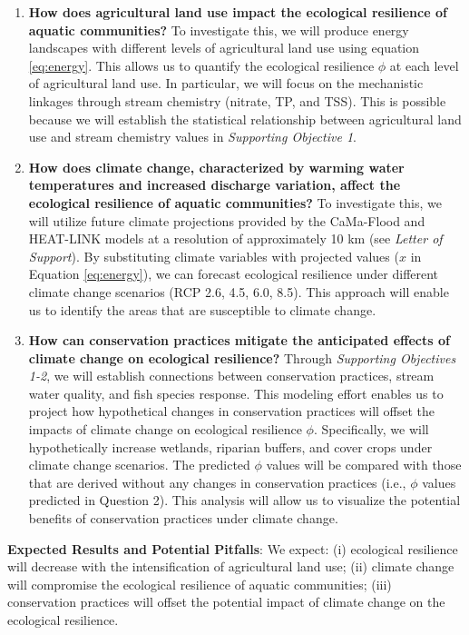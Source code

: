 \documentclass[12pt, class=article, crop=false]{standalone}
\begin{document}
\begin{enumerate}
    \item \textbf{How does agricultural land use impact the ecological resilience of aquatic communities?}
    To investigate this, we will produce energy landscapes with different levels of agricultural land use using equation \ref{eq:energy}.
    This allows us to quantify the ecological resilience $\phi$ at each level of agricultural land use. In particular, we will focus on the mechanistic linkages through stream chemistry (nitrate, TP, and TSS).
    This is possible because we will establish the statistical relationship between agricultural land use and stream chemistry values in \textit{Supporting Objective 1}.
    \item \textbf{How does climate change, characterized by warming water temperatures and increased discharge variation, affect the ecological resilience of aquatic communities?}
    To investigate this, we will utilize future climate projections provided by the CaMa-Flood and HEAT-LINK models at a resolution of approximately 10 km (see \textit{Letter of Support}).
    By substituting climate variables with projected values ($x$ in Equation \ref{eq:energy}), we can forecast ecological resilience under different climate change scenarios (RCP 2.6, 4.5, 6.0, 8.5).
    This approach will enable us to identify the areas that are susceptible to climate change.
    \item \textbf{How can conservation practices mitigate the anticipated effects of climate change on ecological resilience?}
    Through \textit{Supporting Objectives 1-2}, we will establish connections between conservation practices, stream water quality, and fish species response.
    This modeling effort enables us to project how hypothetical changes in conservation practices will offset the impacts of climate change on ecological resilience $\phi$.
    Specifically, we will hypothetically increase wetlands, riparian buffers, and cover crops under climate change scenarios.
    The predicted $\phi$ values will be compared with those that are derived without any changes in conservation practices (i.e., $\phi$ values predicted in Question 2).
    This analysis will allow us to visualize the potential benefits of conservation practices under climate change.
\end{enumerate}

\textbf{Expected Results and Potential Pitfalls}: We expect: (i) ecological resilience will decrease with the intensification of agricultural land use; (ii) climate change will compromise the ecological resilience of aquatic communities; (iii) conservation practices will offset the potential impact of climate change on the ecological resilience.
\end{document}
